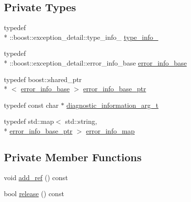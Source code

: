 \subsection*{Private Types}
\begin{DoxyCompactItemize}
\item 
typedef \\*
\-::boost\-::exception\-\_\-detail\-::type\-\_\-info\-\_\- \hyperlink{classecto_1_1except_1_1error__info__container__impl_abe4f51bf533842a5e0b81f3e43ae6267}{type\-\_\-info\-\_\-}
\item 
typedef \\*
\-::boost\-::exception\-\_\-detail\-::error\-\_\-info\-\_\-base \hyperlink{classecto_1_1except_1_1error__info__container__impl_a90c2628bf7c5628003cd24fd369a77da}{error\-\_\-info\-\_\-base}
\item 
typedef boost\-::shared\-\_\-ptr\\*
$<$ \hyperlink{classecto_1_1except_1_1error__info__container__impl_a90c2628bf7c5628003cd24fd369a77da}{error\-\_\-info\-\_\-base} $>$ \hyperlink{classecto_1_1except_1_1error__info__container__impl_a9fbca0758380cb123f790aee77d1d4d8}{error\-\_\-info\-\_\-base\-\_\-ptr}
\item 
typedef const char $\ast$ \hyperlink{classecto_1_1except_1_1error__info__container__impl_a16f5ebd1abcacd60ddbd919ea166958e}{diagnostic\-\_\-information\-\_\-arg\-\_\-t}
\item 
typedef std\-::map$<$ std\-::string, \\*
\hyperlink{classecto_1_1except_1_1error__info__container__impl_a9fbca0758380cb123f790aee77d1d4d8}{error\-\_\-info\-\_\-base\-\_\-ptr} $>$ \hyperlink{classecto_1_1except_1_1error__info__container__impl_a20b3846bc393224fe282eb64a40ee83d}{error\-\_\-info\-\_\-map}
\end{DoxyCompactItemize}
\subsection*{Private Member Functions}
\begin{DoxyCompactItemize}
\item 
void \hyperlink{classecto_1_1except_1_1error__info__container__impl_ae931c5c31454852cdf3d1a84d1d588eb}{add\-\_\-ref} () const 
\item 
bool \hyperlink{classecto_1_1except_1_1error__info__container__impl_a59b8d31c21da10236de67f0a5bfdf4dd}{release} () const 
\end{DoxyCompactItemize}
